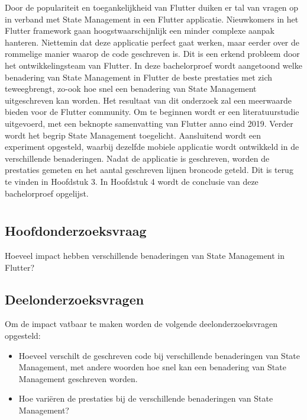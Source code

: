 Door de populariteit en toegankelijkheid van Flutter duiken er tal van vragen op in verband met State Management in een Flutter applicatie. Nieuwkomers in het Flutter framework gaan hoogstwaarschijnlijk een minder complexe aanpak hanteren. Niettemin dat deze applicatie perfect gaat werken, maar eerder over de rommelige manier waarop de code geschreven is. Dit is een erkend probleem door het ontwikkelingsteam van Flutter.
\newline
In deze bachelorproef wordt aangetoond welke benadering van State Management in Flutter de beste prestaties met zich teweegbrengt, zo-ook hoe snel een benadering van State Management uitgeschreven kan worden. Het resultaat van dit onderzoek zal een meerwaarde bieden voor de Flutter community. Om te beginnen wordt er een literatuurstudie uitgevoerd, met een beknopte samenvatting van Flutter anno eind 2019. Verder wordt het begrip State Management toegelicht. Aansluitend wordt een experiment opgesteld, waarbij dezelfde mobiele applicatie wordt ontwikkeld in de verschillende benaderingen. Nadat de applicatie is geschreven, worden de prestaties gemeten en het aantal geschreven lijnen broncode geteld. Dit is terug te vinden in Hoofdstuk 3.
\newline
In Hoofdstuk 4 wordt de conclusie van deze bachelorproef opgelijst.

\section{}
\label{sec:onderzoeksvraag}

\subsection{Hoofdonderzoeksvraag}
Hoeveel impact hebben verschillende benaderingen van State Management in Flutter?

\subsection{Deelonderzoeksvragen}
Om de impact vatbaar te maken worden de volgende deelonderzoeksvragen opgesteld:
\begin{itemize}
    \item Hoeveel verschilt de geschreven code bij verschillende benaderingen van State Management, met andere woorden
    hoe snel kan een benadering van State Management geschreven worden.
    \item{Hoe variëren de prestaties bij de verschillende benaderingen van State Management?}
\end{itemize}


